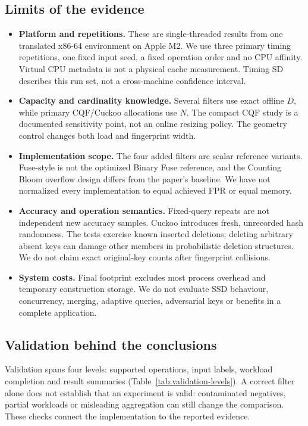 \subsection{Limits of the evidence}
\begin{itemize}
\item \textbf{Platform and repetitions.} These are single-threaded results from one translated x86-64 environment on Apple M2. We use three primary timing repetitions, one fixed input seed, a fixed operation order and no CPU affinity. Virtual CPU metadata is not a physical cache measurement. Timing SD describes this run set, not a cross-machine confidence interval.
\item \textbf{Capacity and cardinality knowledge.} Several filters use exact offline $D$, while primary CQF/Cuckoo allocations use $N$. The compact CQF study is a documented sensitivity point, not an online resizing policy. The geometry control changes both load and fingerprint width.
\item \textbf{Implementation scope.} The four added filters are scalar reference variants. Fuse-style is not the optimized Binary Fuse reference, and the Counting Bloom overflow design differs from the paper's baseline. We have not normalized every implementation to equal achieved FPR or equal memory.
\item \textbf{Accuracy and operation semantics.} Fixed-query repeats are not independent new accuracy samples. Cuckoo introduces fresh, unrecorded hash randomness. The tests exercise known inserted deletions; deleting arbitrary absent keys can damage other members in probabilistic deletion structures. We do not claim exact original-key counts after fingerprint collisions.
\item \textbf{System costs.} Final footprint excludes most process overhead and temporary construction storage. We do not evaluate SSD behaviour, concurrency, merging, adaptive queries, adversarial keys or benefits in a complete application.
\end{itemize}

\subsection{Validation behind the conclusions}
Validation spans four levels: supported operations, input labels, workload completion and result summaries (Table~\ref{tab:validation-levels}). A correct filter alone does not establish that an experiment is valid: contaminated negatives, partial workloads or misleading aggregation can still change the comparison. These checks connect the implementation to the reported evidence.

